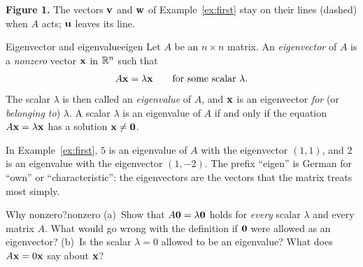 \documentclass[11pt]{article}
\begin{document}
\noindent\textbf{Figure 1.} The vectors $\mathbf{v}$ and $\mathbf{w}$ of Example~\ref{ex:first} stay on their lines (dashed) when $A$ acts; $\mathbf{u}$ leaves its line.

\begin{defn}{Eigenvector and eigenvalue}{eigen}
Let $A$ be an $n\times n$ matrix. An \emph{eigenvector} of $A$ is a \emph{nonzero} vector $\mathbf{x}$ in $\mathbb{R}^n$ such that
\[
A\mathbf{x}=\lambda\mathbf{x}\qquad\text{for some scalar }\lambda.
\]
The scalar $\lambda$ is then called an \emph{eigenvalue} of $A$, and $\mathbf{x}$ is an eigenvector \emph{for} (or \emph{belonging to}) $\lambda$. A scalar $\lambda$ is an eigenvalue of $A$ if and only if the equation $A\mathbf{x}=\lambda\mathbf{x}$ has a solution $\mathbf{x}\neq\mathbf{0}$.
\end{defn}

In Example~\ref{ex:first}, $5$ is an eigenvalue of $A$ with the eigenvector $(1,1)$, and $2$ is an eigenvalue with the eigenvector $(1,-2)$. The prefix ``eigen'' is German for ``own'' or ``characteristic'': the eigenvectors are the vectors that the matrix treats most simply.

\begin{think}{Why nonzero?}{nonzero}
(a)~Show that $A\mathbf{0}=\lambda\mathbf{0}$ holds for \emph{every} scalar $\lambda$ and every matrix $A$. What would go wrong with the definition if $\mathbf{0}$ were allowed as an eigenvector? (b)~Is the scalar $\lambda=0$ allowed to be an eigenvalue? What does $A\mathbf{x}=0\mathbf{x}$ say about $\mathbf{x}$?
\end{think}
\end{document}
